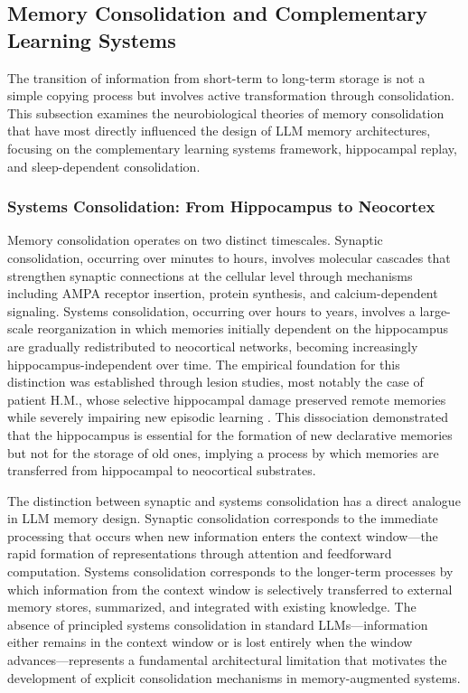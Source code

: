 \subsection{Memory Consolidation and Complementary Learning Systems}

The transition of information from short-term to long-term storage is not a simple copying process but involves active transformation through consolidation. This subsection examines the neurobiological theories of memory consolidation that have most directly influenced the design of LLM memory architectures, focusing on the complementary learning systems framework, hippocampal replay, and sleep-dependent consolidation.

\subsubsection{Systems Consolidation: From Hippocampus to Neocortex}

Memory consolidation operates on two distinct timescales. Synaptic consolidation, occurring over minutes to hours, involves molecular cascades that strengthen synaptic connections at the cellular level through mechanisms including AMPA receptor insertion, protein synthesis, and calcium-dependent signaling. Systems consolidation, occurring over hours to years, involves a large-scale reorganization in which memories initially dependent on the hippocampus are gradually redistributed to neocortical networks, becoming increasingly hippocampus-independent over time. The empirical foundation for this distinction was established through lesion studies, most notably the case of patient H.M., whose selective hippocampal damage preserved remote memories while severely impairing new episodic learning \citep{squire1991medial}. This dissociation demonstrated that the hippocampus is essential for the formation of new declarative memories but not for the storage of old ones, implying a process by which memories are transferred from hippocampal to neocortical substrates.

The distinction between synaptic and systems consolidation has a direct analogue in LLM memory design. Synaptic consolidation corresponds to the immediate processing that occurs when new information enters the context window---the rapid formation of representations through attention and feedforward computation. Systems consolidation corresponds to the longer-term processes by which information from the context window is selectively transferred to external memory stores, summarized, and integrated with existing knowledge. The absence of principled systems consolidation in standard LLMs---information either remains in the context window or is lost entirely when the window advances---represents a fundamental architectural limitation that motivates the development of explicit consolidation mechanisms in memory-augmented systems.

